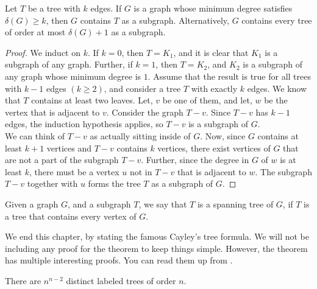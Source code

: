 \begin{thm}
Let $T$ be a tree with $k$ edges. If $G$ is a graph whose minimum degree satisfies $\delta(G) \ge k$, then $G$ contains $T$ as a subgraph. Alternatively, $G$ contains every tree of order at most $\delta(G)+1$ as a subgraph.
\end{thm}
\begin{proof}
We induct on $k$. If $k=0$, then $T=K_{1}$, and it is clear that $K_{1}$ is a subgraph of any graph. Further, if $k=1$, then $T=K_{2}$, and $K_{2}$ is a subgraph of any graph whose minimum degree is $1$. Assume that the result is true for all trees with $k-1$ edges $(k \ge 2)$, and consider a tree $T$ with exactly $k$ edges. We know that $T$ contains at least two leaves. Let, $v$ be one of them, and let, $w$ be the vertex that is adjacent to $v$. Consider the graph $T-v$. Since $T-v$ has $k-1$ edges, the induction hypothesis applies, so $T-v$ is a subgraph of $G$.\\
We can think of $T-v$ as actually sitting inside of $G$. Now, since $G$ contains at least $k+1$ vertices and $T-v$ contains $k$ vertices, there exist vertices of $G$ that are not a part of the subgraph $T-v$. Further, since the degree in $G$ of $w$ is at least $k$, there must be a vertex $u$ not in $T-v$ that is adjacent to $w$. The subgraph $T-v$ together with $u$ forms the tree $T$ as a subgraph of $G$.
\end{proof}

\begin{defn}
    Given a graph $G$, and a subgraph $T$, we say that $T$ is a spanning tree of $G$, if $T$ is a tree that contains every vertex of $G$.
\end{defn}

We end this chapter, by stating the famous Cayley's tree formula. We will not be including any proof for the theorem to keep things simple. However, the theorem has multiple interesting proofs. You can read them up from .

\begin{thm}
    There are $n^{n-2}$ distinct labeled trees of order $n$.
\end{thm}

